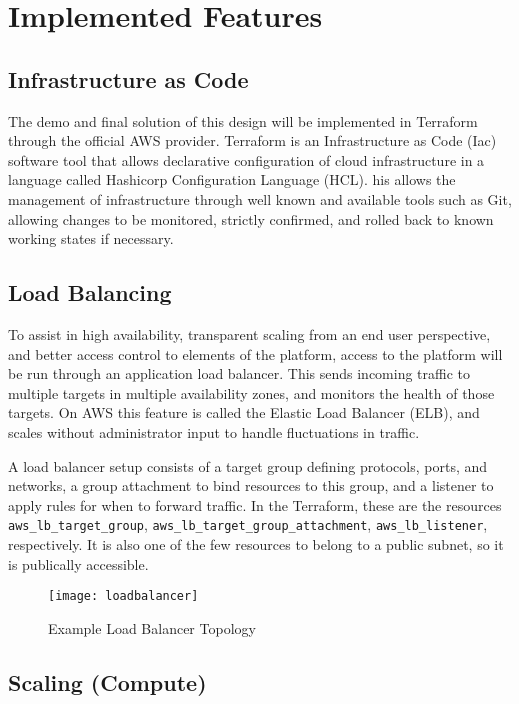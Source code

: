 \section{Implemented Features}

\subsection{Infrastructure as Code}

The demo and final solution of this design will be implemented in Terraform through the official AWS provider. Terraform is an Infrastructure as Code (Iac) software tool that allows declarative configuration of cloud infrastructure in a language called Hashicorp Configuration Language (HCL). his allows the management of infrastructure through well known and available tools such as Git, allowing changes to be monitored, strictly confirmed, and rolled back to known working states if necessary.

\subsection{Load Balancing}

To assist in high availability, transparent scaling from an end user perspective, and better access control to elements of the platform, access to the platform will be run through an application load balancer. This sends incoming traffic to multiple targets in multiple availability zones, and monitors the health of those targets. On AWS this feature is called the Elastic Load Balancer (ELB), and scales without administrator input to handle fluctuations in traffic.

A load balancer setup consists of a target group defining protocols, ports, and networks, a group attachment to bind resources to this group, and a listener to apply rules for when to forward traffic. In the Terraform, these are the resources \texttt{aws\_lb\_target\_group}, \texttt{aws\_lb\_target\_group\_attachment}, \texttt{aws\_lb\_listener}, respectively. It is also one of the few resources to belong to a public subnet, so it is publically accessible.

\begin{figure}[H]\label{fig:loadbalancer}
    \centering
    \texttt{[image: loadbalancer]}
    \caption{Example Load Balancer Topology}
\end{figure}

\subsection{Scaling (Compute)}

